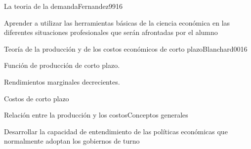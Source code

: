 \begin{syllabus}
\begin{unit}{La teoria de la demanda}{Fernandez99}{16}
\begin{learningoutcomes}
      \item Aprender a utilizar las herramientas básicas de la ciencia económica en las diferentes situaciones profesionales que serán afrontadas por el alumno
   \end{learningoutcomes}
\end{unit}


\begin{unit}{Teoría de la producción y de los costos económicos de corto plazo}{Blanchard00}{16}
\begin{topics}
	\item Función de producción de corto plazo.
	\item Rendimientos marginales decrecientes.
	\item Costos de corto plazo
	\item Relación entre la producción y los costosConceptos generales
\end{topics}

\begin{learningoutcomes}
      \item Desarrollar la capacidad de entendimiento de las políticas económicas que normalmente adoptan los gobiernos de turno
   \end{learningoutcomes}
\end{unit}

\begin{coursebibliography}
\end{coursebibliography}
\end{syllabus}





